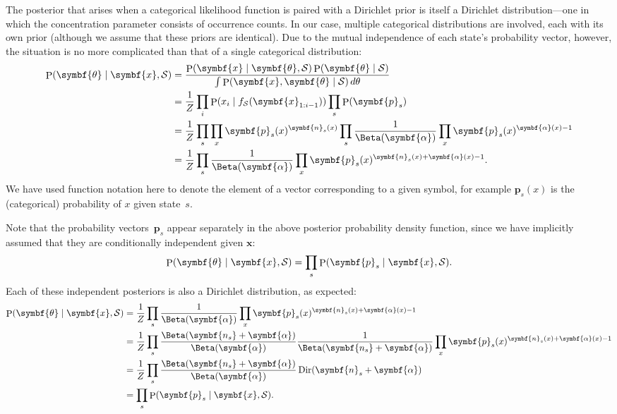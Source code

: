 \documentclass[11pt,a4paper]{article}
\newcommand\mc[1]{\mathcal{#1}}               %
\newcommand\ub[1]{\symbf{#1}}                 %
\DeclareMathOperator\Pb{P}                    %
\DeclarePairedDelimiter\lr{\lparen}{\rparen}  %
\DeclareMathOperator\dir{Dir}            %
\begin{document}
The posterior that arises when a categorical likelihood function is paired with
a Dirichlet prior is itself a Dirichlet distribution---one in which the
concentration parameter consists of occurrence counts. In our case, multiple
categorical distributions are involved, each with its own prior (although we
assume that these priors are identical). Due to the mutual independence of each
state's probability vector, however, the situation is no more complicated than
that of a single categorical distribution:
\begin{align*}
  \Pb\lr{\ub{\theta} \mid \ub{x}, \mc{S}} &=
    \frac{\Pb\lr{\ub{x} \mid \ub{\theta}, \mc{S}}
    \Pb\lr{\ub{\theta} \mid \mc{S}}}
    {\int \Pb\lr{\ub{x}, \ub{\theta} \mid \mc{S}}\, d\theta} \\
  &= \frac{1}{Z} \prod_i \Pb\lr{x_i \mid f_{\mc{S}}\lr{\ub{x}_{1:i-1}}}
    \prod_s \Pb\lr{\ub{p}_s} \\
  &= \frac{1}{Z} \prod_s \prod_x \ub{p}_s(x)^{\ub{n}_s(x)} \prod_s
    \frac{1}{\Beta\lr{\ub{\alpha}}} \prod_x \ub{p}_s(x)^{\ub{\alpha}(x)-1} \\
  &= \frac{1}{Z} \prod_s \frac{1}{\Beta\lr{\ub{\alpha}}}
    \prod_x \ub{p}_s(x)^{\ub{n}_s(x)+\ub{\alpha}(x)-1}.
\end{align*}
We have used function notation here to denote the element of a vector
corresponding to a given symbol, for example \(\ub{p}_s(x)\) is the
(categorical) probability of \(x\) given state~\(s\).

Note that the probability vectors~\(\ub{p}_s\) appear separately in the above
posterior probability density function, since we have implicitly assumed that
they are conditionally independent given \(\ub{x}\):
\begin{equation*}
  \Pb\lr{\ub{\theta} \mid \ub{x}, \mc{S}} =
    \prod_s \Pb\lr{\ub{p}_s \mid \ub{x}, \mc{S}}.
\end{equation*}
Each of these independent posteriors is also a Dirichlet distribution, as
expected:
\begin{align*}
  \Pb\lr{\ub{\theta} \mid \ub{x}, \mc{S}} &=
    \frac{1}{Z} \prod_s \frac{1}{\Beta\lr{\ub{\alpha}}}
    \prod_x \ub{p}_s(x)^{\ub{n}_s(x)+\ub{\alpha}(x)-1} \\
  &= \frac{1}{Z} \prod_s \frac{\Beta\lr{\ub{n_s} + \ub{\alpha}}}
    {\Beta\lr{\ub{\alpha}}} \frac{1}{\Beta\lr{\ub{n_s} + \ub{\alpha}}}
    \prod_x \ub{p}_s(x)^{\ub{n}_s(x)+\ub{\alpha}(x)-1} \\
  &= \frac{1}{Z} \prod_s \frac{\Beta\lr{\ub{n_s} + \ub{\alpha}}}
    {\Beta\lr{\ub{\alpha}}} \dir\lr{\ub{n}_s + \ub{\alpha}} \\
  &= \prod_s \Pb\lr{\ub{p}_s \mid \ub{x}, \mc{S}}.
\end{align*}
\end{document}
